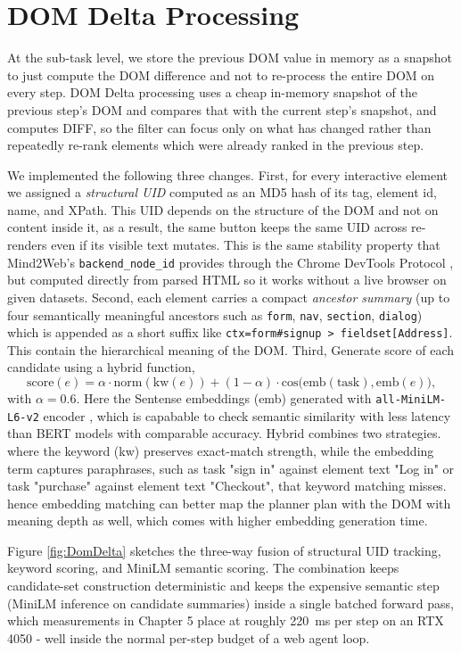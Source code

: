 \section{DOM Delta Processing}


At the sub-task level, we store the previous DOM value in memory as a snapshot to just compute the DOM difference and not to re-process the entire DOM on every step.
DOM Delta processing uses a cheap in-memory snapshot of the previous step's DOM and compares that with the current step's snapshot, and computes DIFF, so the filter can focus only on what has changed rather than repeatedly re-rank elements which were already ranked in the previous step.

We implemented the following three changes. First, for every interactive element we assigned a \textit{structural UID} computed as an MD5 hash of its tag, element id, name, and XPath. This UID depends on the structure of the DOM and not on content inside it, as a result, the same button keeps the same UID across re-renders even if its visible text mutates. This is the same stability property that Mind2Web's \texttt{backend\_node\_id} provides through the Chrome DevTools Protocol \cite{deng2023mind2webgeneralistagentweb}, but computed directly from parsed HTML so it works without a live browser on given datasets. Second, each element carries a compact \textit{ancestor summary} (up to four semantically meaningful ancestors such as \texttt{form}, \texttt{nav}, \texttt{section}, \texttt{dialog}) which is appended as a short suffix like \texttt{ctx=form\#signup > fieldset[Address]}. This contain the hierarchical meaning of the DOM. Third, Generate score of each candidate using a hybrid function,
\[
\mathrm{score}(e) = \alpha \cdot \mathrm{norm}(\mathrm{kw}(e)) + (1-\alpha) \cdot \mathrm{cos}\big(\mathrm{emb}(\mathrm{task}),\mathrm{emb}(e)\big),
\]
with $\alpha = 0.6$. Here the Sentense embeddings (emb) generated with \texttt{all-MiniLM-L6-v2} encoder \cite{wang2020minilm}, which is capabable to check semantic similarity with less latency than BERT models with comparable accuracy. Hybrid combines two strategies. where the keyword (kw)  preserves exact-match strength, while the embedding term captures paraphrases, such as task "sign in" against element text "Log in" or task "purchase" against element text "Checkout", that keyword matching misses. hence embedding matching can better map the planner plan with the DOM with meaning depth as well, which comes with higher embedding generation time.

Figure \ref{fig:DomDelta} sketches the three-way fusion of structural UID tracking, keyword scoring, and MiniLM semantic scoring. The combination keeps candidate-set construction deterministic and keeps the expensive semantic step (MiniLM inference on candidate summaries) inside a single batched forward pass, which measurements in Chapter 5 place at roughly 220~ms per step on an RTX 4050 - well inside the normal per-step budget of a web agent loop.

